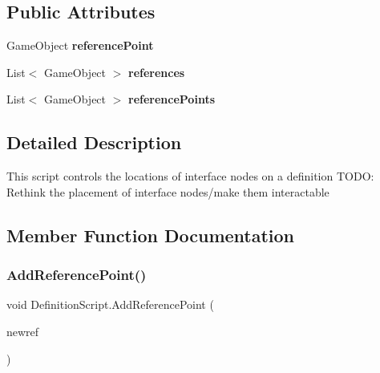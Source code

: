 \subsection*{Public Attributes}
\begin{DoxyCompactItemize}
\item 
\mbox{\label{class_definition_script_ad47da0ed9e66100c5a3a8e647cbef7b4}} 
Game\+Object {\bfseries reference\+Point}
\item 
\mbox{\label{class_definition_script_ade8635fab94307e175a20c484fb5dbfc}} 
List$<$ Game\+Object $>$ {\bfseries references}
\item 
\mbox{\label{class_definition_script_a9d97e6bf584887710cf839fe855443d0}} 
List$<$ Game\+Object $>$ {\bfseries reference\+Points}
\end{DoxyCompactItemize}


\subsection{Detailed Description}
This script controls the locations of interface nodes on a definition T\+O\+DO\+: Rethink the placement of interface nodes/make them interactable 



\subsection{Member Function Documentation}
\mbox{\label{class_definition_script_aa024bbcd14da56aba2a845998453d1ae}} 
\subsubsection{\texorpdfstring{Add\+Reference\+Point()}{AddReferencePoint()}}
{\footnotesize\ttfamily void Definition\+Script.\+Add\+Reference\+Point (\begin{DoxyParamCaption}\item[{Game\+Object}]{newref }\end{DoxyParamCaption})}



